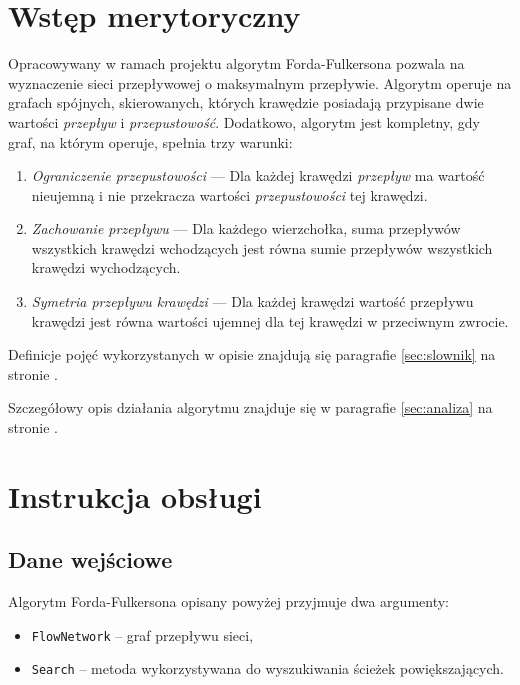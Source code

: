 \documentclass[10pt]{dokument-tiwo}
\begin{document}
\MakeDokumentMeta


\section{Wstęp merytoryczny}

Opracowywany w ramach projektu algorytm Forda-Fulkersona pozwala na wyznaczenie
sieci przepływowej o maksymalnym przepływie. Algorytm operuje na grafach
spójnych, skierowanych, których krawędzie posiadają przypisane dwie wartości
\emph{przepływ} i \emph{przepustowość}. Dodatkowo, algorytm jest kompletny, gdy
graf, na którym operuje, spełnia trzy warunki:

\begin{enumerate}
    \item \emph{Ograniczenie przepustowości} --- Dla każdej krawędzi
    \emph{przepływ} ma wartość nieujemną i nie przekracza wartości
    \emph{przepustowości} tej krawędzi.
    \item \emph{Zachowanie przepływu} --- Dla każdego wierzchołka, suma
    przepływów wszystkich krawędzi wchodzących jest równa sumie przepływów
    wszystkich krawędzi wychodzących.
    \item \emph{Symetria przepływu krawędzi} --- Dla każdej krawędzi wartość
    przepływu krawędzi jest równa wartości ujemnej dla tej krawędzi w
    przeciwnym zwrocie.
\end{enumerate}

\noindent
Definicje pojęć wykorzystanych w opisie znajdują się paragrafie
\ref{sec:slownik} na stronie \pageref{sec:slownik}.

\noindent
Szczegółowy opis działania algorytmu znajduje się w paragrafie \ref{sec:analiza}
na stronie \pageref{sec:analiza}.


\section{Instrukcja obsługi}

\subsection{Dane wejściowe}
Algorytm Forda-Fulkersona opisany powyżej przyjmuje dwa argumenty:
\begin{itemize}
  \item \texttt{FlowNetwork} -- graf przepływu sieci,
  \item \texttt{Search} -- metoda wykorzystywana do wyszukiwania ścieżek
  powiększających.
\end{itemize}
\end{document}
